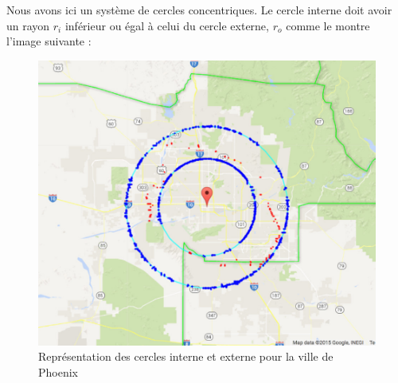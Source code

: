 Nous avons ici un système de cercles concentriques. Le cercle interne doit avoir un rayon $r_i$ inférieur ou égal à celui du cercle externe, $r_o$ comme le montre l'image suivante :
\begin{figure}[H]
 \centering
 \includegraphics[width=.3\textwidth]{img/circles.png}
 \caption{Représentation des cercles interne et externe pour la ville de Phoenix}
\end{figure}
